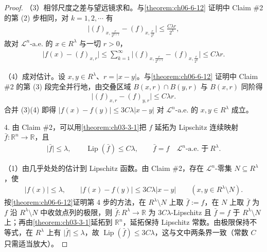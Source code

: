 \documentclass[../../main.tex]{subfiles}%
\begin{document}
\begin{proof}
（3）相邻尺度之差与望远镜求和。与\cref{theorem:ch06-6-12} 证明中 Claim \#2 的第 (2) 步相同，对 $k=1,2,\cdots$ 有
\begin{align*}
\bigl\lvert(f)_{x,\frac{r}{2^{k+1}}}-(f)_{x,\frac{r}{2^k}}\bigr\rvert\le\frac{C\lambda r}{2^k},
\end{align*}
故对 $\mathcal{L}^n$-a.e. 的 $x\in R^\lambda$ 与一切 $r>0$，
\begin{align*}
\lvert f(x)-(f)_{x,r}\rvert\le\sum_{k=1}^{\infty}\bigl\lvert(f)_{x,\frac{r}{2^{k+1}}}-(f)_{x,\frac{r}{2^k}}\bigr\rvert\le C\lambda r .
\end{align*}

（4）成对估计。设 $x,y\in R^\lambda$、$r=\lvert x-y\rvert$。与\cref{theorem:ch06-6-12} 证明中 Claim \#2 的第 (3) 段完全并行地，由交叠区域 $B(x,r)\cap B(y,r)$ 与 $B(x,r)$ 同阶得
\begin{align*}
\bigl\lvert(f)_{x,r}-(f)_{y,r}\bigr\rvert\le C\lambda r .
\end{align*}
合并 (3)(4) 即得 $\lvert f(x)-f(y)\rvert\le3C\lambda\lvert x-y\rvert$ 对 $\mathcal{L}^n$-a.e. 的 $x,y\in R^\lambda$ 成立。%

4. 由 Claim \#2，可以用\cref{theorem:ch03-3-1}把 $f$ 延拓为 Lipschitz 连续映射 $\bar f:\mathbb{R}^n\to\mathbb{R}$，且%
\begin{align*}
\lvert\bar f\rvert\le\lambda,\qquad\operatorname{Lip}(\bar f)\le C\lambda,\qquad\bar f=f\quad\mathcal{L}^n\text{-a.e. 于}\ R^\lambda .
\end{align*}

（1）由几乎处处的估计到 Lipschitz 函数。由 Claim \#2，存在 $\mathcal{L}^n$-零集 $N\subseteq R^\lambda$，使
\begin{align*}
\lvert f(x)\rvert\le\lambda,\qquad\lvert f(x)-f(y)\rvert\le3C\lambda\lvert x-y\rvert\qquad(x,y\in R^\lambda\setminus N).
\end{align*}
按\cref{theorem:ch06-6-12}证明第 4 步的方法，在 $R^\lambda\setminus N$ 上取 $\bar f:=f$，在 $N$ 上取 $\bar f$ 为 $f$ 沿 $R^\lambda\setminus N$ 中收敛点列的极限，则 $\bar f:R^\lambda\to\mathbb{R}$ 为 $3C\lambda$-Lipschitz 且 $\bar f=f$ 于 $R^\lambda\setminus N$ 上；再由\cref{theorem:ch03-3-1}延拓到 $\mathbb{R}^n$，延拓保持 Lipschitz 常数。由极限保持不等式，在 $R^\lambda$ 上有 $\lvert\bar f\rvert\le\lambda$，故 $\operatorname{Lip}(\bar f)\le3C\lambda$，这与文中两条界一致（常数 $C$ 只需适当放大）。%


\end{proof}
\end{document}
